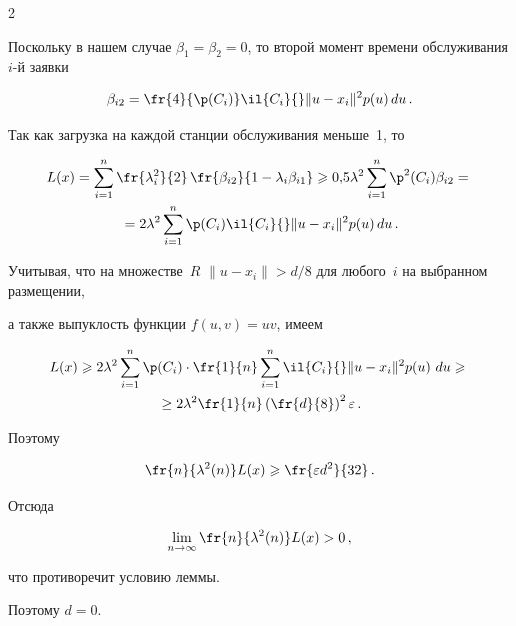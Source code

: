 \begin{multicols}{2}
%


Поскольку в нашем случае $\beta_1=\beta_2=0$, то второй момент времени обслуживания $i$-й заявки 


$$


\beta_{i2}=\fr{4}{{\p} (C_i)}\il{C_i}{}\|u-x_i\|^2 p(u)\,du\,.


$$





Так как загрузка на каждой станции обслуживания меньше~1, то


\begin{multline*}


L(x)=\suml{i=1}{n}\fr{\lambda_i^2}{2} \,\fr{\beta_{i2}} {1-\lambda_i \beta_{i1}}\geqslant


0{,}5\lambda^2\suml{i=1}{n} {\p}^2(C_i)\beta_{i2}={}\\


{}=2\lambda^2\suml{i=1}{n} {\p}(C_i)\il{C_i}{}\|u-x_i\|^2 p(u)\,du\,.


\end{multline*}





Учитывая, что на множестве~$R$ $\|u-x_i\|>d/8$ для любого~$i$ на выбранном размещении, 


а также выпуклость функции $f(u,v)=u v$, имеем


\begin{multline*}


L(x)\geqslant 2\lambda^2\suml{i=1}{n} {\p}(C_i)\cdot \fr{1}{n}\suml{i=1}{n}\il{C_i}{}\|u-x_i\|^2 p(u)~du \geqslant{}\\


{}\geq 2\lambda^2 \fr{1}{n}\left(\fr{d}{8}\right)^2 \varepsilon\,.


\end{multline*}


Поэтому


$$


\fr{n}{\lambda^2(n)}L(x)\geqslant \fr{\varepsilon d^2}{32}\,.


$$


Отсюда


$$


\liml{n\to\infty}\fr{n}{\lambda^2(n)}L(x)> 0\,,


$$


что противоречит условию леммы.





Поэтому $d=0$. \hfill\sqq






\end{multicols}
